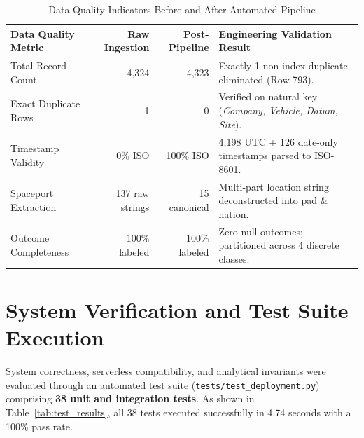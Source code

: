 \documentclass[10pt]{article}
\begin{document}
\begin{table}[htbp]
\centering
\caption{Data-Quality Indicators Before and After Automated Pipeline}
\label{tab:data_quality}
\scriptsize
\begin{tabularx}{\linewidth}{l r r X}
\toprule
\textbf{Data Quality Metric} & \textbf{Raw Ingestion} & \textbf{Post-Pipeline} & \textbf{Engineering Validation Result} \\
\midrule
Total Record Count & 4,324 & 4,323 & Exactly 1 non-index duplicate eliminated (Row 793). \\
Exact Duplicate Rows & 1 & 0 & Verified on natural key (\textit{Company, Vehicle, Datum, Site}). \\
Timestamp Validity & 0\% ISO & 100\% ISO & 4,198 UTC + 126 date-only timestamps parsed to ISO-8601. \\
Spaceport Extraction & 137 raw strings & 15 canonical & Multi-part location string deconstructed into pad \& nation. \\
Outcome Completeness & 100\% labeled & 100\% labeled & Zero null outcomes; partitioned across 4 discrete classes. \\
\bottomrule
\end{tabularx}
\end{table}

\section{System Verification and Test Suite Execution}

System correctness, serverless compatibility, and analytical invariants were evaluated through an automated test suite (\texttt{tests/test\_deployment.py}) comprising \textbf{38 unit and integration tests}. As shown in Table~\ref{tab:test_results}, all 38 tests executed successfully in 4.74 seconds with a 100\% pass rate.
\end{document}
